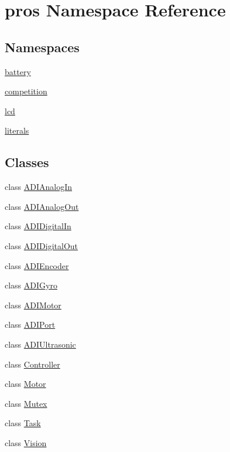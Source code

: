 \hypertarget{namespacepros}{}\section{pros Namespace Reference}
\label{namespacepros}
\subsection*{Namespaces}
\begin{DoxyCompactItemize}
\item 
 \mbox{\hyperlink{namespacepros_1_1battery}{battery}}
\item 
 \mbox{\hyperlink{namespacepros_1_1competition}{competition}}
\item 
 \mbox{\hyperlink{namespacepros_1_1lcd}{lcd}}
\item 
 \mbox{\hyperlink{namespacepros_1_1literals}{literals}}
\end{DoxyCompactItemize}
\subsection*{Classes}
\begin{DoxyCompactItemize}
\item 
class \mbox{\hyperlink{classpros_1_1ADIAnalogIn}{A\+D\+I\+Analog\+In}}
\item 
class \mbox{\hyperlink{classpros_1_1ADIAnalogOut}{A\+D\+I\+Analog\+Out}}
\item 
class \mbox{\hyperlink{classpros_1_1ADIDigitalIn}{A\+D\+I\+Digital\+In}}
\item 
class \mbox{\hyperlink{classpros_1_1ADIDigitalOut}{A\+D\+I\+Digital\+Out}}
\item 
class \mbox{\hyperlink{classpros_1_1ADIEncoder}{A\+D\+I\+Encoder}}
\item 
class \mbox{\hyperlink{classpros_1_1ADIGyro}{A\+D\+I\+Gyro}}
\item 
class \mbox{\hyperlink{classpros_1_1ADIMotor}{A\+D\+I\+Motor}}
\item 
class \mbox{\hyperlink{classpros_1_1ADIPort}{A\+D\+I\+Port}}
\item 
class \mbox{\hyperlink{classpros_1_1ADIUltrasonic}{A\+D\+I\+Ultrasonic}}
\item 
class \mbox{\hyperlink{classpros_1_1Controller}{Controller}}
\item 
class \mbox{\hyperlink{classpros_1_1Motor}{Motor}}
\item 
class \mbox{\hyperlink{classpros_1_1Mutex}{Mutex}}
\item 
class \mbox{\hyperlink{classpros_1_1Task}{Task}}
\item 
class \mbox{\hyperlink{classpros_1_1Vision}{Vision}}
\end{DoxyCompactItemize}
